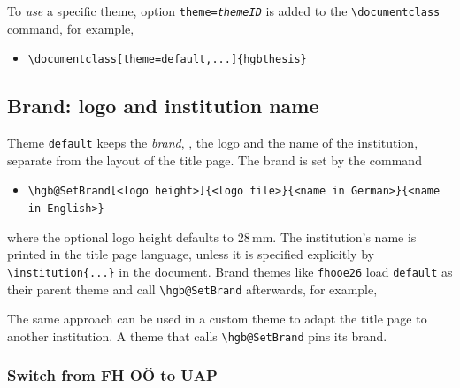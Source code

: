 \documentclass[language=english]{hgbarticle}
\begin{document}
To \emph{use} a specific theme, option \texttt{theme=\textit{themeID}}
is added to the \verb!\documentclass! command, for example,
\begin{itemize}
	\item[] \verb!\documentclass[theme=default,...]{hgbthesis}!
\end{itemize}


\subsection{Brand: logo and institution name}
\label{sec:ThemeBrand}

Theme \texttt{default} keeps the \emph{brand}, \ie, the logo and the name of the institution,
separate from the layout of the title page. The brand is set by the command
\begin{itemize}
	\item[] \verb!\hgb@SetBrand[<logo height>]{<logo file>}{<name in German>}{<name in English>}!
\end{itemize}
%
where the optional logo height defaults to 28\,mm.
The institution's name is printed in the title page language, unless it is specified
explicitly by \verb!\institution{...}! in the document.
Brand themes like \texttt{fhooe26} load \texttt{default} as their parent theme and call
\verb!\hgb@SetBrand! afterwards, for example,
%
\begin{LaTeXCode}[numbers=none]
\end{LaTeXCode}
%
The same approach can be used in a custom theme to adapt the title page to another institution.
A theme that calls \verb!\hgb@SetBrand! pins its brand.

\subsubsection*{Switch from FH OÖ to UAP}
\end{document}
